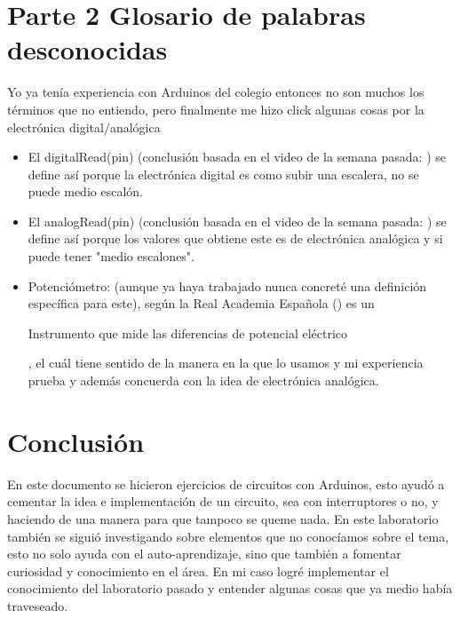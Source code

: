 \documentclass[stu, 12pt, letterpaper, donotrepeattitle, floatsintext, natbib, helv]{apa7}
\begin{document}
\section{Parte 2 Glosario de palabras desconocidas}
Yo ya tenía experiencia con Arduinos del colegio entonces no son muchos los términos que no entiendo, pero finalmente me hizo click algunas cosas por la electrónica digital/analógica

\begin{itemize}
    \item El digitalRead(pin) (conclusión basada en el video de la semana pasada: \cite{video}) se define así porque la electrónica digital es como subir una escalera, no se puede medio escalón.
    \item El analogRead(pin) (conclusión basada en el video de la semana pasada: \cite{video}) se define así porque los valores que obtiene este es de electrónica analógica y si puede tener "medio escalones".
    \item Potenciómetro: (aunque ya haya trabajado nunca concreté una definición específica para este), según la Real Academia Española (\cite{potenciometroDef}) es un \begin{quoting} Instrumento que mide las diferencias de potencial eléctrico \end{quoting}, el cuál tiene sentido de la manera en la que lo usamos y mi experiencia prueba y además concuerda con la idea de electrónica analógica.
\end{itemize}

\section{Conclusión}
En este documento se hicieron ejercicios de circuitos con Arduinos, esto ayudó a cementar la idea e implementación de un circuito, sea con interruptores o no, y haciendo de una manera para que tampoco se queme nada. En este laboratorio también se siguió investigando sobre elementos que no conocíamos sobre el tema, esto no solo ayuda con el auto-aprendizaje, sino que también a fomentar curiosidad y conocimiento en el área. En mi caso logré implementar el conocimiento del laboratorio pasado y entender algunas cosas que ya medio había traveseado.

\newpage
\renewcommand\refname{\large\textbf{Referencias}}

\end{document}
